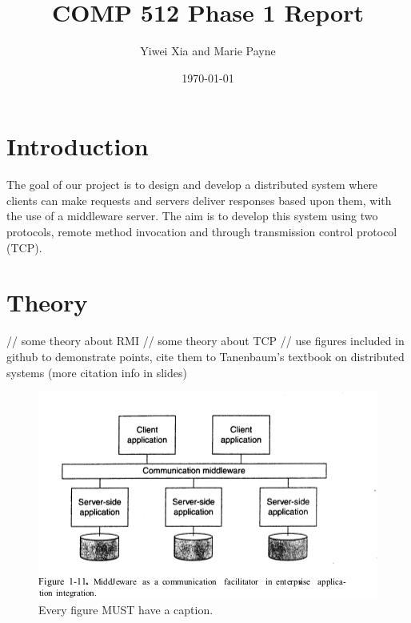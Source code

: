 \documentclass[letterpaper,12pt]{article}
\begin{document}
\title{COMP 512 Phase 1 Report}
\author{Yiwei Xia and Marie Payne}
\date{\today}
\maketitle

\section{Introduction}

The goal of our project is to design and develop a distributed system where clients can make requests and servers deliver responses based upon them, with the use of a middleware server. The aim is to develop this system using two protocols, remote method invocation and through transmission control protocol (TCP).

\section{Theory}

// some theory about RMI
// some theory about TCP
// use figures included in github to demonstrate points, cite them to Tanenbaum's textbook on distributed systems (more citation info in slides)


\begin{figure}[ht] 
	\centering \includegraphics[width=0.8\columnwidth]{figure1.png}
	\caption{
		\label{fig:samplesetup} %
		Every figure MUST have a caption.
	}
\end{figure}
\end{document}

